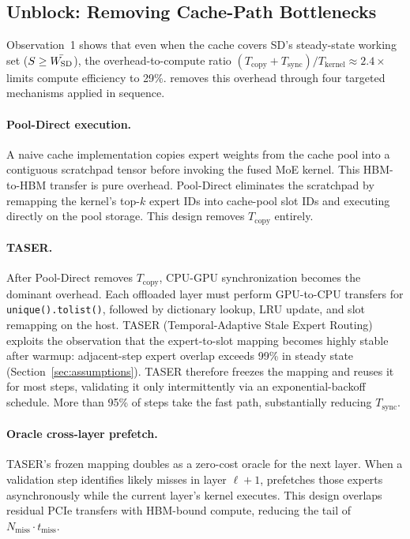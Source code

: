 \subsection{Unblock: Removing Cache-Path Bottlenecks}

Observation~1 shows that even when the cache covers SD's steady-state working set ($S \ge \bar{W_{\mathrm{SD}}}$), the overhead-to-compute ratio $(T_{\mathrm{copy}} + T_{\mathrm{sync}}) / T_{\mathrm{kernel}} \approx 2.4\times$ limits compute efficiency to 29\%. \sysname removes this overhead through four targeted mechanisms applied in sequence.

\paragraph{Pool-Direct execution.}
A naive cache implementation copies expert weights from the cache pool into a contiguous scratchpad tensor before invoking the fused MoE kernel. This HBM-to-HBM transfer is pure overhead. Pool-Direct eliminates the scratchpad by remapping the kernel's top-$k$ expert IDs into cache-pool slot IDs and executing directly on the pool storage. This design removes $T_{\mathrm{copy}}$ entirely.

\paragraph{TASER.}
After Pool-Direct removes $T_{\mathrm{copy}}$, CPU-GPU synchronization becomes the dominant overhead. Each offloaded layer must perform GPU-to-CPU transfers for \texttt{unique().tolist()}, followed by dictionary lookup, LRU update, and slot remapping on the host. TASER (Temporal-Adaptive Stale Expert Routing) exploits the observation that the expert-to-slot mapping becomes highly stable after warmup: adjacent-step expert overlap exceeds 99\% in steady state (Section~\ref{sec:assumptions}). TASER therefore freezes the mapping and reuses it for most steps, validating it only intermittently via an exponential-backoff schedule. More than 95\% of steps take the fast path, substantially reducing $T_{\mathrm{sync}}$.

\paragraph{Oracle cross-layer prefetch.}
TASER's frozen mapping doubles as a zero-cost oracle for the next layer. When a validation step identifies likely misses in layer $\ell+1$, \sysname prefetches those experts asynchronously while the current layer's kernel executes. This design overlaps residual PCIe transfers with HBM-bound compute, reducing the tail of $N_{\mathrm{miss}} \cdot t_{\mathrm{miss}}$.

